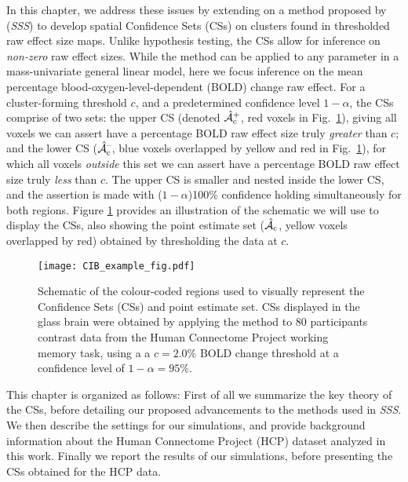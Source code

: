In this chapter, we address these issues by extending on a method proposed by \citet*{Sommerfeld2018-zl} (\textit{SSS}) to develop spatial Confidence Sets (CSs) on clusters found in thresholded raw effect size maps. Unlike hypothesis testing, the CSs allow for inference on \textit{non-zero} raw effect sizes. While the method can be applied to any parameter in a mass-univariate general linear model, here we focus inference on the mean percentage blood-oxygen-level-dependent (BOLD) change raw effect. For a cluster-forming threshold $c$, and a predetermined confidence level $1-\alpha$, the CSs comprise of two sets: the upper CS (denoted $\operatorname{\hat{\mathcal{A}}_{c}^+}$, red voxels in Fig.\ \ref{fig:example_fig}), giving all voxels we can assert have a percentage BOLD raw effect size truly \textit{greater} than $c$; and the lower CS ($\operatorname{\hat{\mathcal{A}}_{c}^{\textrm{--}}}$, blue voxels overlapped by yellow and red in Fig.\ \ref{fig:example_fig}), for which all voxels \textit{outside} this set we can assert have a percentage BOLD raw effect size truly \textit{less} than $c$. The upper CS is smaller and nested inside the lower CS, and the assertion is made with ($1-\alpha$)100\% confidence holding simultaneously for both regions. Figure \ref{fig:example_fig} provides an illustration of the schematic we will use to display the CSs, also showing the point estimate set ($\operatorname{\hat{\mathcal{A}}_{c}}$, yellow voxels overlapped by red) obtained by thresholding the data at $c$.

\begin{figure}[htbp]
\hspace*{-1.0cm}
\centering
    \texttt{[image: CIB\_example\_fig.pdf]}
\caption{Schematic of the colour-coded regions used to visually represent the Confidence Sets (CSs) and point estimate set. CSs displayed in the glass brain were obtained by applying the method to 80 participants contrast data from the Human Connectome Project working memory task, using a a $c = 2.0\%$ BOLD change threshold at a confidence level of $1 - \alpha = 95\%$.}
\label{fig:example_fig}
\end{figure}


This chapter is organized as follows: First of all we summarize the key theory of the CSs, before detailing our proposed advancements to the methods used in \textit{SSS}. We then describe the settings for our simulations, and provide background information about the Human Connectome Project (HCP) dataset analyzed in this work. Finally we report the results of our simulations, before presenting the CSs obtained for the HCP data. 

